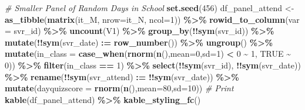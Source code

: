 \documentclass[
]{book}
\newenvironment{Shaded}{\begin{snugshade}}{\end{snugshade}}
\newcommand{\CommentTok}[1]{\textcolor[rgb]{0.56,0.35,0.01}{\textit{#1}}}
\newcommand{\DataTypeTok}[1]{\textcolor[rgb]{0.13,0.29,0.53}{#1}}
\newcommand{\DecValTok}[1]{\textcolor[rgb]{0.00,0.00,0.81}{#1}}
\newcommand{\ErrorTok}[1]{\textcolor[rgb]{0.64,0.00,0.00}{\textbf{#1}}}
\newcommand{\KeywordTok}[1]{\textcolor[rgb]{0.13,0.29,0.53}{\textbf{#1}}}
\newcommand{\NormalTok}[1]{#1}
\newcommand{\OperatorTok}[1]{\textcolor[rgb]{0.81,0.36,0.00}{\textbf{#1}}}
\newcommand{\OtherTok}[1]{\textcolor[rgb]{0.56,0.35,0.01}{#1}}
\newcommand{\StringTok}[1]{\textcolor[rgb]{0.31,0.60,0.02}{#1}}
\begin{document}
\begin{Shaded}
\begin{Highlighting}[]
\CommentTok{\# Smaller Panel of Random Days in School}
\KeywordTok{set.seed}\NormalTok{(}\DecValTok{456}\NormalTok{)}
\NormalTok{df\_panel\_attend \textless{}{-}}\StringTok{ }\KeywordTok{as\_tibble}\NormalTok{(}\KeywordTok{matrix}\NormalTok{(it\_M, }\DataTypeTok{nrow=}\NormalTok{it\_N, }\DataTypeTok{ncol=}\DecValTok{1}\NormalTok{)) }\OperatorTok{\%\textgreater{}\%}
\StringTok{  }\KeywordTok{rowid\_to\_column}\NormalTok{(}\DataTypeTok{var =}\NormalTok{ svr\_id) }\OperatorTok{\%\textgreater{}\%}
\StringTok{  }\KeywordTok{uncount}\NormalTok{(V1) }\OperatorTok{\%\textgreater{}\%}
\StringTok{  }\KeywordTok{group\_by}\NormalTok{(}\OperatorTok{!!}\KeywordTok{sym}\NormalTok{(svr\_id)) }\OperatorTok{\%\textgreater{}\%}\StringTok{ }\KeywordTok{mutate}\NormalTok{(}\OperatorTok{!!}\KeywordTok{sym}\NormalTok{(svr\_date) }\OperatorTok{:}\ErrorTok{=}\StringTok{ }\KeywordTok{row\_number}\NormalTok{()) }\OperatorTok{\%\textgreater{}\%}
\StringTok{  }\KeywordTok{ungroup}\NormalTok{() }\OperatorTok{\%\textgreater{}\%}\StringTok{ }\KeywordTok{mutate}\NormalTok{(}\DataTypeTok{in\_class =} \KeywordTok{case\_when}\NormalTok{(}\KeywordTok{rnorm}\NormalTok{(}\KeywordTok{n}\NormalTok{(),}\DataTypeTok{mean=}\DecValTok{0}\NormalTok{,}\DataTypeTok{sd=}\DecValTok{1}\NormalTok{) }\OperatorTok{\textless{}}\StringTok{ }\DecValTok{0} \OperatorTok{\textasciitilde{}}\StringTok{ }\DecValTok{1}\NormalTok{, }\OtherTok{TRUE} \OperatorTok{\textasciitilde{}}\StringTok{ }\DecValTok{0}\NormalTok{)) }\OperatorTok{\%\textgreater{}\%}
\StringTok{  }\KeywordTok{filter}\NormalTok{(in\_class }\OperatorTok{==}\StringTok{ }\DecValTok{1}\NormalTok{) }\OperatorTok{\%\textgreater{}\%}\StringTok{ }\KeywordTok{select}\NormalTok{(}\OperatorTok{!!}\KeywordTok{sym}\NormalTok{(svr\_id), }\OperatorTok{!!}\KeywordTok{sym}\NormalTok{(svr\_date)) }\OperatorTok{\%\textgreater{}\%}
\StringTok{  }\KeywordTok{rename}\NormalTok{(}\OperatorTok{!!}\KeywordTok{sym}\NormalTok{(svr\_attend) }\OperatorTok{:}\ErrorTok{=}\StringTok{ }\OperatorTok{!!}\KeywordTok{sym}\NormalTok{(svr\_date)) }\OperatorTok{\%\textgreater{}\%}
\StringTok{  }\KeywordTok{mutate}\NormalTok{(}\DataTypeTok{dayquizscore =} \KeywordTok{rnorm}\NormalTok{(}\KeywordTok{n}\NormalTok{(),}\DataTypeTok{mean=}\DecValTok{80}\NormalTok{,}\DataTypeTok{sd=}\DecValTok{10}\NormalTok{))}
\CommentTok{\# Print}
\KeywordTok{kable}\NormalTok{(df\_panel\_attend) }\OperatorTok{\%\textgreater{}\%}
\StringTok{  }\KeywordTok{kable\_styling\_fc}\NormalTok{()}
\end{Highlighting}
\end{Shaded}
\end{document}
